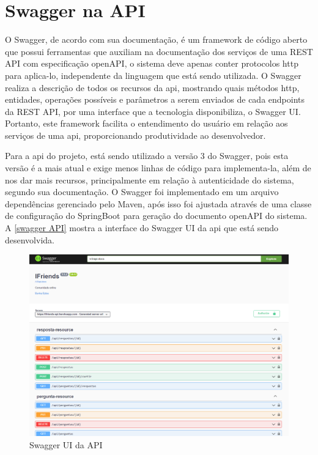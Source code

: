 \section{Swagger na API}
O Swagger, de acordo com sua documentação, é um \gls{framework} de código aberto que possui ferramentas que auxiliam na documentação dos serviços de uma \gls{REST API} com especificação \gls{openAPI}, o sistema deve apenas conter protocolos \acs{http} para aplica-lo, independente da linguagem que está sendo utilizada. O Swagger realiza a descrição de todos os recursos da \acs{api}, mostrando quais métodos \acs{http}, entidades, operações possíveis e parâmetros a serem enviados de cada \glspl{endpoint} da \gls{REST API}, por uma interface que a tecnologia disponibiliza, o Swagger UI. Portanto, este \gls{framework} facilita o entendimento do usuário em relação aos serviços de uma \acs{api}, proporcionando produtividade ao desenvolvedor.

Para a \acs{api} do projeto, está sendo utilizado a versão 3 do Swagger, pois esta versão é a mais atual e exige menos linhas de código para implementa-la, além de nos dar mais recursos, principalmente em relação à autenticidade do sistema, segundo sua documentação. O Swagger foi implementado em um arquivo dependências gerenciado pelo \gls{Maven}, após isso foi ajustada através de uma classe de configuração do \gls{SpringBoot} para geração do documento \gls{openAPI} do sistema. A \autoref{swagger API} mostra a interface do Swagger UI da \acs{api} que está sendo desenvolvida.

\begin{figure}[htb]
\centering
\caption{\label{swagger API} Swagger UI da API}
\includegraphics[width=1\textwidth]{anexos/Imagens_Swagger/API_swagger.png}
\end{figure}
\FloatBarrier

